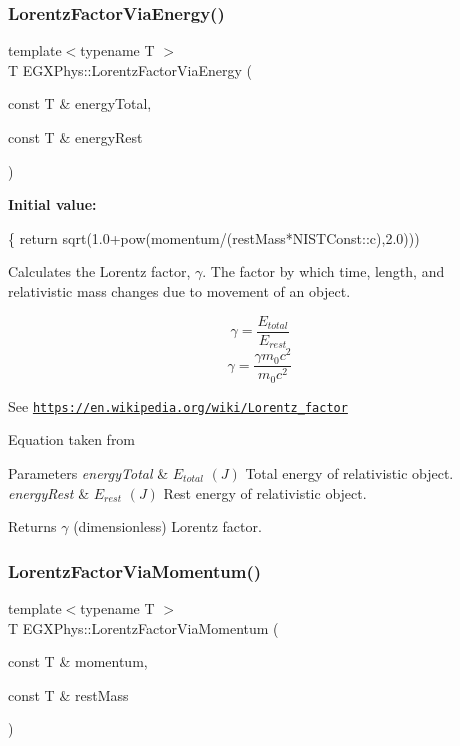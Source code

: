 \subsubsection{\texorpdfstring{Lorentz\+Factor\+Via\+Energy()}{LorentzFactorViaEnergy()}}
{\footnotesize\ttfamily template$<$typename T $>$ \\
T E\+G\+X\+Phys\+::\+Lorentz\+Factor\+Via\+Energy (\begin{DoxyParamCaption}\item[{const T \&}]{energy\+Total,  }\item[{const T \&}]{energy\+Rest }\end{DoxyParamCaption})}

{\bfseries Initial value\+:}
\begin{DoxyCode}
\{
        \textcolor{keywordflow}{return} sqrt(1.0+pow(momentum/(restMass*NISTConst::c),2.0)))
\end{DoxyCode}


Calculates the Lorentz factor, $\gamma$. The factor by which time, length, and relativistic mass changes due to movement of an object. 

\[\gamma=\frac{E_{total}}{E_{rest}}\] \[\gamma=\frac{\gamma m_0 c^2}{m_0 c^2}\]

See \href{https://en.wikipedia.org/wiki/Lorentz_factor}{\tt https\+://en.\+wikipedia.\+org/wiki/\+Lorentz\+\_\+factor}

Equation taken from


\begin{DoxyParams}{Parameters}
{\em energy\+Total} & $E_{total}$ $(J)$ Total energy of relativistic object. \\
\hline
{\em energy\+Rest} & $E_{rest}$ $(J)$ Rest energy of relativistic object. \\
\hline
\end{DoxyParams}
\begin{DoxyReturn}{Returns}
$\gamma$ (dimensionless) Lorentz factor. 
\end{DoxyReturn}
\mbox{\label{group___e_g_x_phys-_lorentz_transformations_ga1ea24128654ac333dd843afdd5c003b7}} 
\subsubsection{\texorpdfstring{Lorentz\+Factor\+Via\+Momentum()}{LorentzFactorViaMomentum()}}
{\footnotesize\ttfamily template$<$typename T $>$ \\
T E\+G\+X\+Phys\+::\+Lorentz\+Factor\+Via\+Momentum (\begin{DoxyParamCaption}\item[{const T \&}]{momentum,  }\item[{const T \&}]{rest\+Mass }\end{DoxyParamCaption})}



